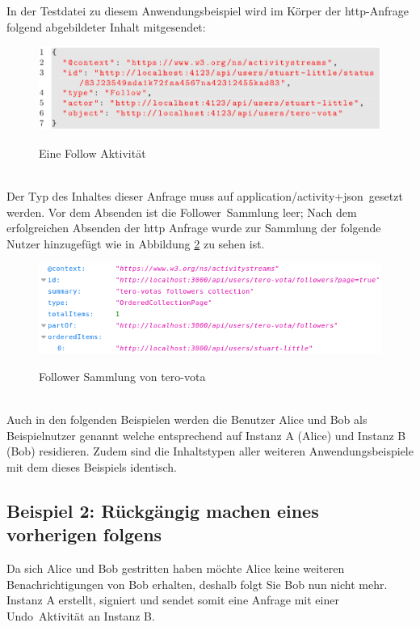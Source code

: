 In der Testdatei zu diesem Anwendungsbeispiel wird im Körper der \gls{http}-Anfrage folgend abgebildeter Inhalt mitgesendet:
\begin{figure}[h]
	\centering
	\includegraphics[scale=0.45]{figures/follow-activity.png}
	\label{fig:follow-activity}
	\caption{Eine Follow Aktivität}
\end{figure}\\
Der Typ des Inhaltes dieser Anfrage muss auf \glqq application/activity+json\grqq~gesetzt werden. Vor dem Absenden ist die \glqq Follower\grqq~Sammlung leer; Nach dem erfolgreichen Absenden der \gls{http} Anfrage wurde zur Sammlung der folgende Nutzer hinzugefügt wie in Abbildung  \ref{fig:follow-activity-result} zu sehen ist.
\begin{figure}[h]
	\centering
	\includegraphics[scale=0.7]{figures/follow-activity-result.png}
	\label{fig:follow-activity-result}
	\caption{Follower Sammlung von tero-vota}
\end{figure}\\
Auch in den folgenden Beispielen werden die Benutzer Alice und Bob als Beispielnutzer genannt welche entsprechend auf Instanz A (Alice) und Instanz B (Bob) residieren. Zudem sind die Inhaltstypen aller weiteren Anwendungsbeispiele mit dem dieses Beispiels identisch.
\subsection{
	\textbf{Beispiel 2}: Rückgängig machen eines vorherigen folgens
}
Da sich Alice und Bob gestritten haben möchte Alice keine weiteren Benachrichtigungen von Bob erhalten, deshalb folgt Sie Bob nun nicht mehr. Instanz A erstellt, signiert und sendet somit eine Anfrage mit einer \glqq Undo\grqq~Aktivität an Instanz B.\\


